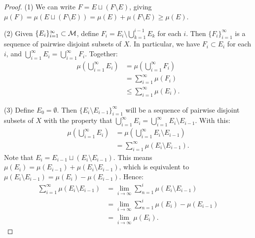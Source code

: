         \begin{proof}
            (1) We can write $F = E \sqcup (F\setminus E)$, giving $\mu(F) = \mu(E \sqcup (F \setminus E)) = \mu(E) + \mu(F\setminus E) \geq \mu(E)$.

            (2) Given $\{E_i\}_{i = 1}^\infty \subset \mathcal{M}$, define $F_i = E_i \setminus \bigcup_{k = 1}^{i-1}E_k$ for each $i$. Then $\{F_i\}_{i = 1}^\infty$ is a sequence of pairwise disjoint subsets of $X$. In particular, we have $F_i \subset E_i$ for each $i$, and $\bigcup_{i = 1}^\infty E_i = \bigcup_{i = 1}^\infty F_i$. Together:
                \begin{equation*}
                \begin{split}
                    \mu\left(\bigcup_{i = 1}^\infty E_i\right)
                    & = \mu \left(\bigcup_{i = 1}^\infty F_i\right) \\
                    & = \sum_{i = 1}^\infty \mu(F_i) \\
                    & \leq \sum_{i = 1}^\infty \mu(E_i).
                \end{split}
                \end{equation*}

            (3) Define $E_0 = \emptyset$. Then $\{E_i \setminus E_{i-1}\}_{i = 1}^\infty$ will be a sequence of pairwise disjoint subsets of $X$ with the property that $\bigcup_{i = 1}^\infty E_i = \bigcup_{i = 1}^\infty E_i \setminus E_{i-1}$. With this:
                \begin{equation*}
                \begin{split}
                    \mu\left(\bigcup_{i = 1}^\infty E_i\right) 
                    & = \mu \left( \bigcup_{i = 1}^\infty E_i \setminus E_{i-1} \right) \\
                    & = \sum_{i = 1}^\infty \mu(E_i \setminus E_{i-1}).
                \end{split}
                \end{equation*}
            Note that $E_{i} = E_{i-1} \sqcup (E_{i} \setminus E_{i-1})$. This means $\mu(E_i) = \mu(E_{i-1}) + \mu(E_i \setminus E_{i-1})$, which is equivalent to $\mu(E_i \setminus E_{i-1}) = \mu(E_i) - \mu(E_{i-1})$. Hence:
                \begin{equation*}
                \begin{split}
                    \sum_{i = 1}^\infty \mu(E_i \setminus E_{i-1}) 
                    & = \lim_{i \rightarrow \infty} \sum_{n = 1}^i \mu(E_i \setminus E_{i-1}) \\
                    & = \lim_{i \rightarrow \infty} \sum_{n = 1}^i \mu(E_i) - \mu(E_{i-1}) \\
                    & = \lim_{i \rightarrow \infty} \mu(E_i).
                \end{split}
                \end{equation*}


\end{proof}
